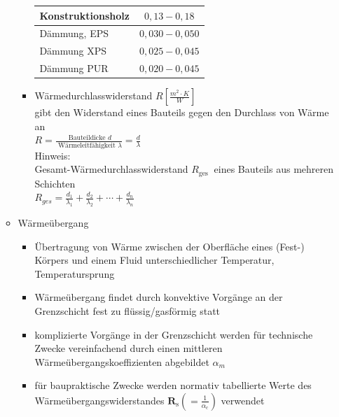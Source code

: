 \documentclass[fleqn,twoside,dvipsnames]{article}
\begin{document}
\begin{itemize}
\begin{itemize}
\begin{itemize}
\begin{tabular}{|l|c|}
                                            \hline Konstruktionsholz & $0,13-0,18$ \\
                                            \hline Dämmung, EPS & $0,030-0,050$ \\
                                            \hline Dämmung XPS & $0,025-0,045$ \\
                                            \hline Dämmung PUR & $0,020-0,045$ \\
                                            \hline
                                        \end{tabular}
                                    \item Wärmedurchlasswiderstand $R\left[\frac{m^2 \cdot K}{W}\right]$\\
                                    gibt den Widerstand eines Bauteils gegen den Durchlass von Wärme an\\
                                    $R=\frac{\text { Bauteildicke } d}{\text { Wärmeleitfähigkeit } \lambda}=\frac{d}{\lambda}$\\
                                    Hinweis:\\
                                    Gesamt-Wärmedurchlasswiderstand $R_{\text {ges }}$ eines Bauteils aus mehreren Schichten\\
                                    $R_{g e s}=\frac{d_1}{\lambda_1}+\frac{d_2}{\lambda_2}+\cdots+\frac{d_n}{\lambda_n}$
                                \end{itemize}
                            \item Wärmeübergang
                                \begin{itemize}
                                    \item Übertragung von Wärme zwischen der Oberfläche eines (Fest-) Körpers und einem Fluid unterschiedlicher Temperatur, Temperatursprung
                                    \item Wärmeübergang findet durch konvektive Vorgänge an der Grenzschicht fest zu flüssig/gasförmig statt
                                    \item komplizierte Vorgänge in der Grenzschicht werden für technische Zwecke vereinfachend durch einen mittleren Wärmeübergangskoeffizienten abgebildet $\alpha_m$
                                    \item für baupraktische Zwecke werden normativ tabellierte Werte des
                                    Wärmeübergangswiderstandes $\mathbf{R}_{\mathrm{s}}\left(=\frac{1}{\alpha_{\mathrm{c}}}\right)$ verwendet\\

\end{itemize}
\end{itemize}
\end{itemize}
\end{document}
